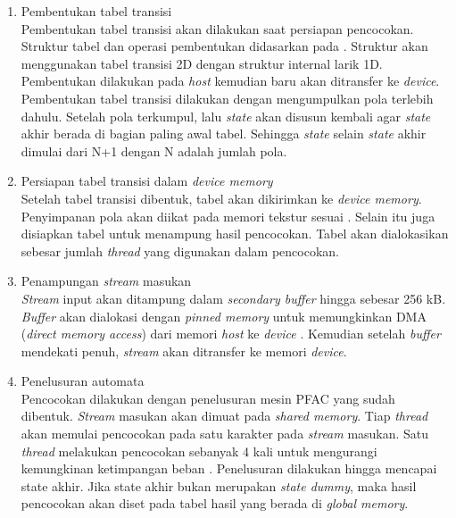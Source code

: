       \begin{enumerate}

      \item
      Pembentukan tabel transisi \\
      Pembentukan tabel transisi akan dilakukan saat persiapan pencocokan. Struktur
      tabel dan operasi pembentukan didasarkan pada \cite{lin2013}. Struktur akan
      menggunakan tabel transisi 2D dengan struktur internal larik 1D. Pembentukan dilakukan pada \emph{host} kemudian baru akan ditransfer ke \emph{device}. Pembentukan tabel transisi dilakukan dengan mengumpulkan pola terlebih dahulu. Setelah pola terkumpul, lalu \emph{state} akan disusun kembali agar \emph{state} akhir berada di bagian paling awal tabel. Sehingga \emph{state} selain \emph{state} akhir dimulai dari N+1 dengan N adalah jumlah pola. 

      \item
      Persiapan tabel transisi dalam \emph{device memory} \\
      Setelah tabel transisi dibentuk, tabel akan dikirimkan ke \emph{device memory}. Penyimpanan pola akan diikat pada memori tekstur sesuai \cite{lin2013}. Selain itu juga disiapkan tabel untuk menampung hasil pencocokan. Tabel akan dialokasikan sebesar jumlah \emph{thread} yang digunakan dalam pencocokan.

      \item
      Penampungan \emph{stream} masukan \\
      \emph{Stream} input akan ditampung dalam \emph{secondary buffer} hingga sebesar 256 kB. \emph{Buffer} akan dialokasi dengan \emph{pinned memory} untuk memungkinkan DMA (\emph{direct memory access}) dari memori \emph{host} ke \emph{device} \citep{gnort2008}. Kemudian setelah \emph{buffer} mendekati penuh, \emph{stream} akan ditransfer ke memori \emph{device}.

      \item
      Penelusuran automata \\
      Pencocokan dilakukan dengan penelusuran mesin PFAC yang sudah dibentuk. \emph{Stream} masukan akan dimuat pada \emph{shared memory}. Tiap \emph{thread} akan memulai pencocokan pada satu karakter pada \emph{stream} masukan. Satu \emph{thread} melakukan pencocokan sebanyak 4 kali untuk mengurangi kemungkinan ketimpangan beban \citep{lin2013}. Penelusuran dilakukan hingga mencapai state akhir. Jika state akhir bukan merupakan \emph{state dummy}, maka hasil pencocokan akan diset pada tabel hasil yang berada di \emph{global memory}.

      \end{enumerate}

